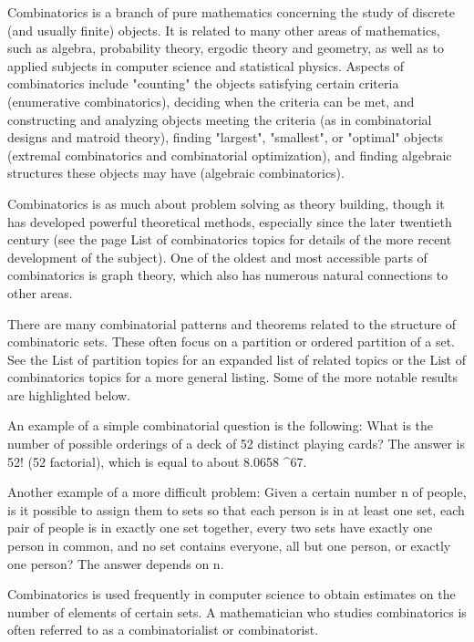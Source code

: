 Combinatorics is a branch of pure mathematics concerning the study of discrete (and usually finite) objects. It is related to many other areas of mathematics, such as algebra, probability theory, ergodic theory and geometry, as well as to applied subjects in computer science and statistical physics. Aspects of combinatorics include "counting" the objects satisfying certain criteria (enumerative combinatorics), deciding when the criteria can be met, and constructing and analyzing objects meeting the criteria (as in combinatorial designs and matroid theory), finding "largest", "smallest", or "optimal" objects (extremal combinatorics and combinatorial optimization), and finding algebraic structures these objects may have (algebraic combinatorics).

Combinatorics is as much about problem solving as theory building, though it has developed powerful theoretical methods, especially since the later twentieth century (see the page List of combinatorics topics for details of the more recent development of the subject). One of the oldest and most accessible parts of combinatorics is graph theory, which also has numerous natural connections to other areas.

There are many combinatorial patterns and theorems related to the structure of combinatoric sets. These often focus on a partition or ordered partition of a set. See the List of partition topics for an expanded list of related topics or the List of combinatorics topics for a more general listing. Some of the more notable results are highlighted below.

An example of a simple combinatorial question is the following: What is the number of possible orderings of a deck of 52 distinct playing cards? The answer is 52! (52 factorial), which is equal to about 8.0658 ^{67}.

Another example of a more difficult problem: Given a certain number n of people, is it possible to assign them to sets so that each person is in at least one set, each pair of people is in exactly one set together, every two sets have exactly one person in common, and no set contains everyone, all but one person, or exactly one person? The answer depends on n.

Combinatorics is used frequently in computer science to obtain estimates on the number of elements of certain sets. A mathematician who studies combinatorics is often referred to as a combinatorialist or combinatorist.
